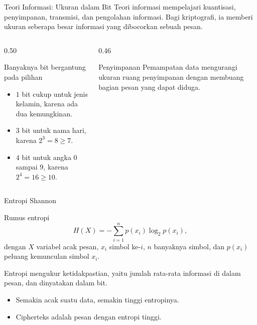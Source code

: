 \documentclass[aspectratio=169,11pt]{beamer}
\begin{document}
\begin{frame}{Teori Informasi: Ukuran dalam Bit}
    Teori informasi mempelajari kuantisasi, penyimpanan, transmisi, dan
    pengolahan informasi. Bagi kriptografi, ia memberi ukuran seberapa besar
    informasi yang dibocorkan sebuah pesan.
    \vspace{0.15cm}
    \begin{columns}[T,onlytextwidth]
        \begin{column}{0.50\textwidth}
            \begin{block}{Banyaknya bit bergantung pada pilihan}
                \begin{itemize}
                    \item $1$ bit cukup untuk jenis kelamin, karena ada dua
                          kemungkinan.
                    \item $3$ bit untuk nama hari, karena $2^3 = 8 \ge 7$.
                    \item $4$ bit untuk angka $0$ sampai $9$, karena
                          $2^4 = 16 \ge 10$.
                \end{itemize}
            \end{block}
        \end{column}
        \begin{column}{0.46\textwidth}
            \begin{exampleblock}{Penyimpanan}
                Pemampatan data mengurangi ukuran ruang penyimpanan dengan
                membuang bagian pesan yang dapat diduga.
            \end{exampleblock}
        \end{column}
    \end{columns}
\end{frame}

\begin{frame}{Entropi Shannon}
    \begin{block}{Rumus entropi}
        \[ H(X) = -\sum_{i=1}^{n} p(x_i) \log_2 p(x_i), \]
        dengan $X$ variabel acak pesan, $x_i$ simbol ke-$i$, $n$ banyaknya
        simbol, dan $p(x_i)$ peluang kemunculan simbol $x_i$.
    \end{block}
    \vspace{0.15cm}
    Entropi mengukur ketidakpastian, yaitu jumlah rata-rata informasi di
    dalam pesan, dan dinyatakan dalam bit.
    \vspace{0.1cm}
    \begin{itemize}
        \item Semakin acak suatu data, semakin tinggi entropinya.
        \item Cipherteks adalah pesan dengan entropi tinggi.
    \end{itemize}
\end{frame}
\end{document}
